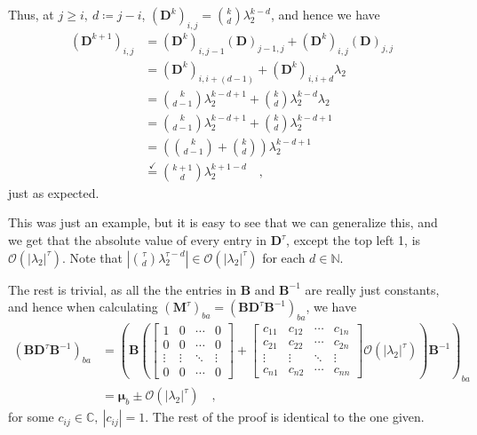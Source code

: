 \documentclass[../../main.tex]{subfiles}
\begin{document}
    Thus, at $j \geq i, \ d \coloneqq j - i$, $(\bm{D}^k)_{i,j} = \binom{k}{d} \lambda_2^{k - d}$, and hence we have
    \begin{align*}
        (\bm{D}^{k + 1})_{i,j} &= (\bm{D}^k)_{i, j - 1} (\bm{D})_{j - 1, j} + (\bm{D}^k)_{i, j} (\bm{D})_{j, j} \\
        &= (\bm{D}^k)_{i, i + (d - 1)} + (\bm{D}^k)_{i, i + d} \lambda_2 \\
        &= \binom{k}{d - 1} \lambda_2^{k - d + 1} + \binom{k}{d} \lambda_2^{k - d} \lambda_2 \\
        &= \binom{k}{d - 1} \lambda_2^{k - d + 1} + \binom{k}{d} \lambda_2^{k - d + 1} \\
        &= \left( \binom{k}{d - 1} + \binom{k}{d} \right) \lambda_2^{k - d + 1} \\
        &\overset{\checkmark}{=} \binom{k + 1}{d} \lambda_2^{k + 1 - d} \quad ,
    \end{align*}
    just as expected.

    This was just an example, but it is easy to see that we can generalize this, and we get that the absolute value of every entry in $\bm{D}^\tau$, except the top left 1, is $\mathcal{O}(|\lambda_2|^\tau)$. Note that $|\binom{\tau}{d} \lambda_2^{\tau - d}| \in \mathcal{O}(|\lambda_2|^\tau)$ for each $d \in \mathbb{N}$.

    The rest is trivial, as all the the entries in $\bm{B}$ and $\bm{B}^{-1}$ are really just constants, and hence when calculating $(\bm{M}^\tau)_{ba} = (\bm{BD}^\tau\bm{B}^{-1})_{ba}$, we have
    \begin{align*}
        (\bm{BD}^\tau\bm{B}^{-1})_{ba} &= \left( \bm{B} \left(
            \begin{bmatrix}
            1      & 0      & \cdots & 0 \\
            0      & 0      & \cdots & 0 \\
            \vdots & \vdots & \ddots & \vdots \\
            0      & 0      & \cdots & 0
            \end{bmatrix}
            +
            \begin{bmatrix}
            c_{11} & c_{12} & \cdots & c_{1n} \\
            c_{21} & c_{22} & \cdots & c_{2n} \\
            \vdots & \vdots & \ddots & \vdots \\
            c_{n1} & c_{n2} & \cdots & c_{nn}
            \end{bmatrix}
            \mathcal{O}(|\lambda_2|^\tau)
        \right)
        \bm{B}^{-1} \right)_{ba} \\
        &= \bm{\mu}_b \pm \mathcal{O}(|\lambda_2|^\tau)
        \quad ,
    \end{align*}
    for some $c_{ij} \in \mathbb{C}, \ |c_{ij}| = 1$. The rest of the proof is identical to the one given.
\end{document}
